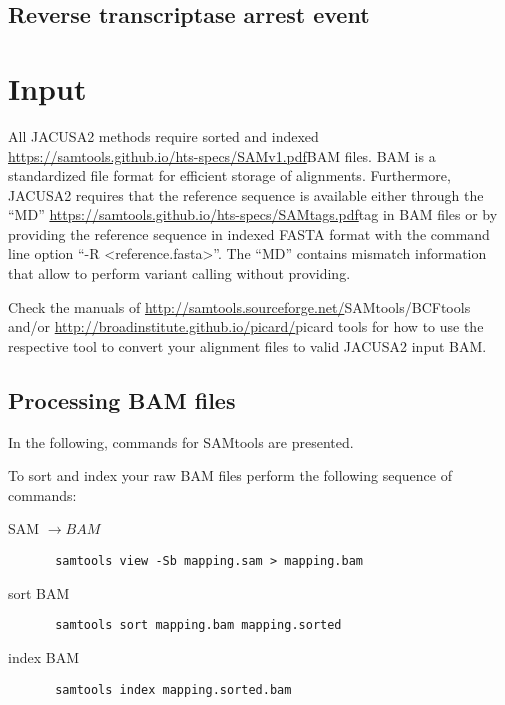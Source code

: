 \documentclass[10pt,a4paper,draft]{article}
\begin{document}
\subsection{Reverse transcriptase arrest event}
\section{Input}
All JACUSA2 methods require sorted and indexed \url{https://samtools.github.io/hts-specs/SAMv1.pdf}{BAM} files.
BAM is a standardized file format for efficient storage of alignments.
Furthermore, JACUSA2 requires that the reference sequence is available either through the ``MD'' 
\url{https://samtools.github.io/hts-specs/SAMtags.pdf}{tag} in BAM files or by providing the reference 
sequence in indexed FASTA format with the command line option ``-R <reference.fasta>''.
The ``MD'' contains mismatch information that allow to perform variant calling without providing.    

Check the manuals of
\url{http://samtools.sourceforge.net/}{SAMtools/BCFtools} and/or
\url{http://broadinstitute.github.io/picard/}{picard tools} for how to use the
respective tool to convert your alignment files to valid JACUSA2 input BAM.

\subsection{Processing BAM files}
In the following, commands for SAMtools are presented.

To sort and index your raw BAM files perform the following sequence of commands:
\begin{description}
\item[SAM $\rightarrow BAM$] \begin{verbatim} samtools view -Sb mapping.sam > mapping.bam \end{verbatim}
\item[sort BAM] \begin{verbatim} samtools sort mapping.bam mapping.sorted \end{verbatim} 
\item[index BAM] \begin{verbatim} samtools index mapping.sorted.bam \end{verbatim}
\end{description}
\end{document}
